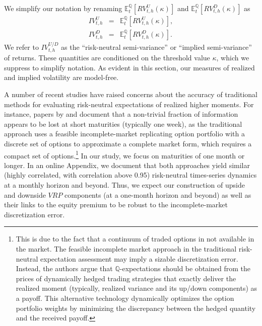\documentclass[11pt]{article}
\begin{document}
We simplify our notation by renaming $\mathbb{E}_t^{\mathbb{Q}}[RV^{U}_{t,h}(\kappa)]$ and $\mathbb{E}_t^{\mathbb{Q}}[RV^{D}_{t,h}(\kappa)]$ as
\begin{eqnarray}
  IV^{U}_{t,h} &=& \mathbb{E}_t^{\mathbb{Q}}[RV^{U}_{t,h}(\kappa)], \label{EqIV+}\\
  IV^{D}_{t,h} &=& \mathbb{E}_t^{\mathbb{Q}}[RV^{D}_{t,h}(\kappa)]. \label{EqIV-}
\end{eqnarray}
We refer to $IV^{U/D}_{t,h}$ as the ``risk-neutral semi-variance'' or ``implied semi-variance'' of returns. These quantities are conditioned on the threshold value $\kappa$, which we suppress to simplify notation. As evident in this section, our measures of realized and implied volatility are model-free.

A number of recent studies have raised concerns about the accuracy of traditional methods for evaluating risk-neutral expectations of realized higher moments. For instance, papers by \cite{Orlowski} and \cite{SchneiderTrojani2015} document that a non-trivial fraction of information appears to be lost at short maturities (typically one week), as the traditional approach uses a feasible incomplete-market replicating option portfolio with a discrete set of options to approximate a complete market form, which requires a compact set of options.\footnote{This is due to the fact that a continuum of traded options in not available in the market. The feasible incomplete market approach in the traditional risk-neutral expectation assessment may imply a sizable discretization error. Instead, the authors argue that $\mathbb{Q}$-expectations should be obtained from the prices of dynamically hedged trading strategies that exactly deliver the realized moment (typically, realized variance and its up/down components) as a payoff. This alternative technology dynamically optimizes the option portfolio weights by minimizing the discrepancy between the hedged quantity and the received payoff. } In our study, we focus on maturities of one month or longer. In an online Appendix, we document that both approaches yield similar (highly correlated, with correlation above 0.95) risk-neutral times-series dynamics at a monthly horizon and beyond. Thus, we expect our construction of upside and downside $VRP$ components (at a one-month horizon and beyond) as well as their links to the equity premium to be robust to the incomplete-market discretization error.
\end{document}
